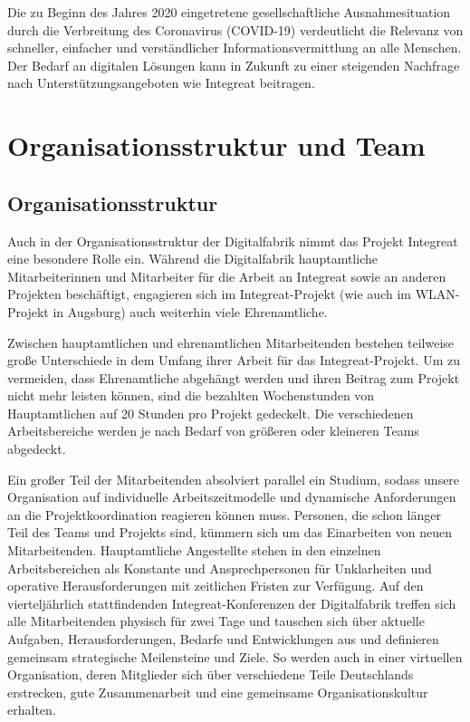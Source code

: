 \documentclass[12pt, a4paper]{article} %
\begin{document}
Die zu Beginn des Jahres 2020 eingetretene gesellschaftliche
Ausnahmesituation durch die Verbreitung des Coronavirus (COVID-19)
verdeutlicht die Relevanz von schneller, einfacher und verständlicher
Informationsvermittlung an alle Menschen. Der Bedarf an digitalen
Lösungen kann in Zukunft zu einer steigenden Nachfrage nach
Unterstützungsangeboten wie Integreat beitragen.

\hypertarget{organisationsstruktur-und-team}{%
\section{Organisationsstruktur und
Team}\label{organisationsstruktur-und-team}}

\hypertarget{organisationsstruktur}{%
\subsection{Organisationsstruktur}\label{organisationsstruktur}}

Auch in der Organisationsstruktur der Digitalfabrik nimmt das Projekt
Integreat eine besondere Rolle ein. Während die Digitalfabrik
hauptamtliche Mitarbeiterinnen und Mitarbeiter für die Arbeit an
Integreat sowie an anderen Projekten beschäftigt, engagieren sich im
Integreat-Projekt (wie auch im WLAN-Projekt in Augsburg) auch weiterhin
viele Ehrenamtliche.

Zwischen hauptamtlichen und ehrenamtlichen Mitarbeitenden bestehen
teilweise große Unterschiede in dem Umfang ihrer Arbeit für das
Integreat-Projekt. Um zu vermeiden, dass Ehrenamtliche abgehängt werden
und ihren Beitrag zum Projekt nicht mehr leisten können, sind die
bezahlten Wochenstunden von Hauptamtlichen auf 20 Stunden pro Projekt
gedeckelt. Die verschiedenen Arbeitsbereiche werden je nach Bedarf von
größeren oder kleineren Teams abgedeckt.

Ein großer Teil der Mitarbeitenden absolviert parallel ein Studium,
sodass unsere Organisation auf individuelle Arbeitszeitmodelle und
dynamische Anforderungen an die Projektkoordination reagieren können
muss. Personen, die schon länger Teil des Teams und Projekts sind,
kümmern sich um das Einarbeiten von neuen Mitarbeitenden. Hauptamtliche
Angestellte stehen in den einzelnen Arbeitsbereichen als Konstante und
Ansprechpersonen für Unklarheiten und operative Herausforderungen mit
zeitlichen Fristen zur Verfügung. Auf den vierteljährlich stattfindenden
Integreat-Konferenzen der Digitalfabrik treffen sich alle Mitarbeitenden
physisch für zwei Tage und tauschen sich über aktuelle Aufgaben,
Herausforderungen, Bedarfe und Entwicklungen aus und definieren
gemeinsam strategische Meilensteine und Ziele. So werden auch in einer
virtuellen Organisation, deren Mitglieder sich über verschiedene Teile
Deutschlands erstrecken, gute Zusammenarbeit und eine gemeinsame
Organisationskultur erhalten.
\end{document}
